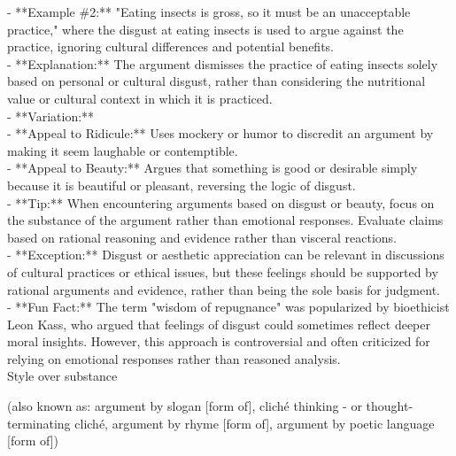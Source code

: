 \documentclass[a4paper,12pt,single,pdftex]{scrartcl}
\begin{document}
    
      - **Example \#2:** "Eating insects is gross, so it must be an unacceptable practice," where the disgust at eating insects is used to argue against the practice, ignoring cultural differences and potential benefits.
    \\

    
      - **Explanation:** The argument dismisses the practice of eating insects solely based on personal or cultural disgust, rather than considering the nutritional value or cultural context in which it is practiced.
    \\

    
      - **Variation:**
    \\

    
        - **Appeal to Ridicule:** Uses mockery or humor to discredit an argument by making it seem laughable or contemptible.
    \\

    
        - **Appeal to Beauty:** Argues that something is good or desirable simply because it is beautiful or pleasant, reversing the logic of disgust.
    \\

    
      - **Tip:** When encountering arguments based on disgust or beauty, focus on the substance of the argument rather than emotional responses. Evaluate claims based on rational reasoning and evidence rather than visceral reactions.
    \\

    
      - **Exception:** Disgust or aesthetic appreciation can be relevant in discussions of cultural practices or ethical issues, but these feelings should be supported by rational arguments and evidence, rather than being the sole basis for judgment.
    \\

    
      - **Fun Fact:** The term "wisdom of repugnance" was popularized by bioethicist Leon Kass, who argued that feelings of disgust could sometimes reflect deeper moral insights. However, this approach is controversial and often criticized for relying on emotional responses rather than reasoned analysis.
    \\

  

Style over substance
    
      (also known as: argument by slogan [form of], cliché thinking - or thought-terminating cliché, argument by rhyme [form of], argument by poetic language [form of])
    \\
\end{document}
